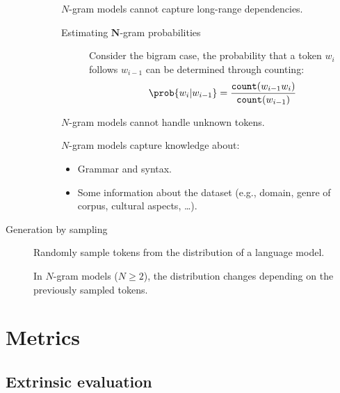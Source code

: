 \begin{description}
\begin{description}
                \begin{remark}
                    $N$-gram models cannot capture long-range dependencies.
                \end{remark}

                \begin{description}
                    \item[Estimating $\mathbf{N}$-gram probabilities]
                        Consider the bigram case, the probability that a token $w_i$ follows $w_{i-1}$ can be determined through counting:
                        \[ \prob{w_i | w_{i-1}} = \frac{\texttt{count}(w_{i-1} w_i)}{\texttt{count}(w_{i-1})} \]
                \end{description}

                \begin{remark}
                    $N$-gram models cannot handle unknown tokens.
                \end{remark}

                \begin{remark}
                    $N$-gram models capture knowledge about:
                    \begin{itemize}
                        \item Grammar and syntax.
                        \item Some information about the dataset (e.g., domain, genre of corpus, cultural aspects, \dots).
                    \end{itemize}
                \end{remark}
        \end{description}

    \item[Generation by sampling] 
        Randomly sample tokens from the distribution of a language model.

        \begin{remark}
            In $N$-gram models ($N \geq 2$), the distribution changes depending on the previously sampled tokens.
        \end{remark}
\end{description}



\section{Metrics}


\subsection{Extrinsic evaluation}

